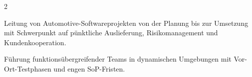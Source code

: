 \begin{paracol}{2}
\begin{tightemize}
\item Leitung von Automotive-Softwareprojekten von der Planung bis zur Umsetzung mit Schwerpunkt auf pünktliche Auslieferung, Risikomanagement und Kundenkooperation.
\item Führung funktionsübergreifender Teams in dynamischen Umgebungen mit Vor-Ort-Testphasen und engen SoP-Fristen.
\end{tightemize}
\sectionsep






\end{paracol}
